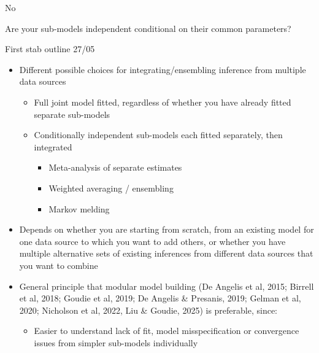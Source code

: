 \documentclass{article}
\begin{document}
\begin{tree}
\begin{tree}
\begin{tree}
        \end{tree}
        \item No
        \begin{tree}
        \item Are your sub-models independent conditional on their common parameters?
        \end{tree}
    \end{tree}
\end{tree}


First stab outline 27/05
\begin{itemize}
    \item Different possible choices for integrating/ensembling inference from multiple data sources
    \begin{itemize}
        \item Full joint model fitted, regardless of whether you have already fitted separate sub-models
        \item Conditionally independent sub-models each fitted separately, then integrated
        \begin{itemize}
            \item Meta-analysis of separate estimates
            \item Weighted averaging / ensembling
            \item Markov melding
        \end{itemize}
    \end{itemize}
    \item Depends on whether you are starting from scratch, from an existing model for one data source to which you want to add others, or whether you have multiple alternative sets of existing inferences from different data sources that you want to combine
    \item General principle that modular model building (De Angelis et al, 2015; Birrell et al, 2018; Goudie et al, 2019; De Angelis \& Presanis, 2019; Gelman et al, 2020; Nicholson et al, 2022, Liu \& Goudie, 2025) is preferable, since:
    \begin{itemize}
        \item Easier to understand lack of fit, model misspecification or convergence issues from simpler sub-models individually

\end{itemize}
\end{itemize}
\end{document}
